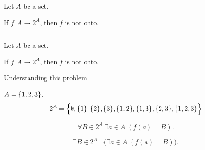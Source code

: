 \begin{frame}{}
  \begin{theorem}
    Let $A$ be a set. 

    If $f: A \to 2^{A}$, then $f$ is not onto.
  \end{theorem}

  \vspace{0.60cm}
  \begin{columns}
    \pause
    \pause
    \pause
    \pause
  \end{columns}
\end{frame}

\begin{frame}{}
  \begin{theorem}
    Let $A$ be a set. 

    If $f: A \to 2^{A}$, then $f$ is not onto.
  \end{theorem}

  \vspace{0.30cm}
  Understanding this problem:
  \begin{description}
    \pause
    \item[$2^{A}$] $A = \{1,2,3\}$,
      \[
	2^{A} = \Big\{\emptyset, \{1\}, \{2\}, \{3\}, \{1,2\}, \{1,3\}, \{2,3\}, \{1,2,3\}\Big\}
      \]
    \pause
    \item[Onto]
      \[
	\forall B \in 2^{A}\; \exists a \in A\; (f(a) = B).
      \]
    \pause
    \item[Not Onto]
      \[
	\exists B \in 2^{A}\; \lnot \Big(\exists a \in A\; (f(a) = B)\Big).
      \]
  \end{description}
\end{frame}

